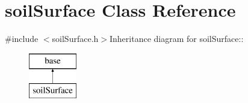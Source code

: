 \hypertarget{classsoil_surface}{
\section{soilSurface Class Reference}
\label{classsoil_surface}
}


{\ttfamily \#include $<$soilSurface.h$>$}Inheritance diagram for soilSurface::\begin{figure}[H]
\begin{center}
\leavevmode
\includegraphics[height=2cm]{classsoil_surface}
\end{center}
\end{figure}
